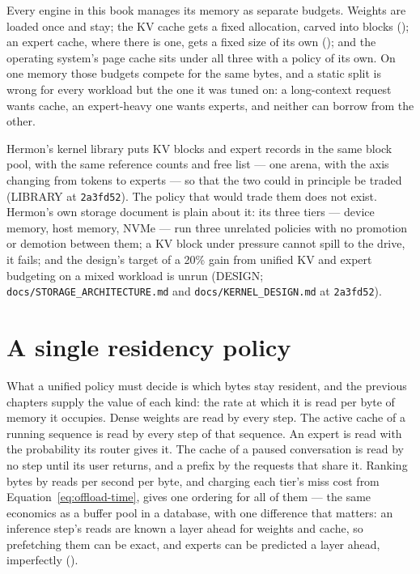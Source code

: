 Every engine in this book manages its memory as separate budgets. Weights are
loaded once and stay; the KV cache gets a fixed allocation, carved into blocks
(); an expert cache, where there is one, gets a fixed size of
its own (); and the operating system's page cache sits
under all three with a policy of its own. On one memory those budgets compete
for the same bytes, and a static split is wrong for every workload but the one
it was tuned on: a long-context request wants cache, an expert-heavy one wants
experts, and neither can borrow from the other.

Hermon's kernel library puts KV blocks and expert records in the same block
pool, with the same reference counts and free list --- one arena, with the
axis changing from tokens to experts --- so that the two could in principle be
traded (LIBRARY at \texttt{2a3fd52}). The policy that would trade them does not
exist. Hermon's own storage document is plain about it: its three tiers ---
device memory, host memory, NVMe --- run three unrelated policies with no
promotion or demotion between them; a KV block under pressure cannot spill to
the drive, it fails; and the design's target of a 20\% gain from unified KV and
expert budgeting on a mixed workload is unrun (DESIGN;
\texttt{docs/STORAGE\_ARCHITECTURE.md} and \texttt{docs/KERNEL\_DESIGN.md} at
\texttt{2a3fd52}).

\section{A single residency policy}

What a unified policy must decide is which bytes stay resident, and the
previous chapters supply the value of each kind: the rate at which it is read
per byte of memory it occupies. Dense weights are read by every step. The
active cache of a running sequence is read by every step of that sequence. An
expert is read with the probability its router gives it. The cache of a paused
conversation is read by no step until its user returns, and a prefix by the
requests that share it. Ranking bytes by reads per second per byte, and
charging each tier's miss cost from Equation~\ref{eq:offload-time}, gives one
ordering for all of them --- the same economics as a buffer pool in a database,
with one difference that matters: an inference step's reads are known a layer
ahead for weights and cache, so prefetching them can be exact, and experts can
be predicted a layer ahead, imperfectly ().

